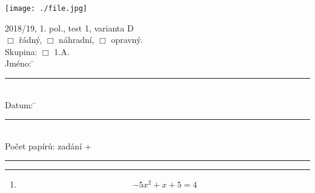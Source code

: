 \documentclass[czech, a4paper, 12pt]{exam}
\begin{document}
\begin{minipage}{9cm}
    \texttt{[image: ./file.jpg]}
\end{minipage}
\begin{minipage}{5cm}
\begin{tabbing}
2018/19, 1. pol., test 1, varianta D\\[.1cm]
$\Box$ řádný, \hspace{.2cm} $\Box$ náhradní, \hspace{.2cm} $\Box$ opravný. \\[.1cm]
Skupina:
    $\Box$ 1.A. \\[.1cm]
Jméno: \hspace{2cm} \= \rule{4.7cm}{.1mm} \\[.1cm]
Datum: \hspace{2cm} \= \rule{4.7cm}{.1mm} \\[.1cm]
Počet papírů:\> zadání + \rule{1.2cm}{.1mm}
\end{tabbing}
\end{minipage}

\vspace{.3cm}
\begin{center}
\rule{17cm}{.7mm}
\end{center}
\vspace{.3cm}



\begin{enumerate}


    \item
    $$ -5 x^2 + x + 5 = 4 $$




\end{enumerate}
\end{document}
